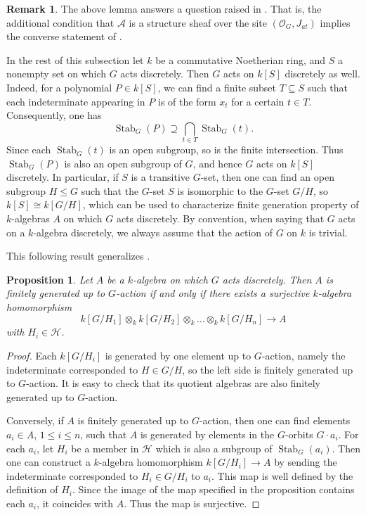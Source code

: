\documentclass[11pt, reqno]{amsart}
\theoremstyle{plain}
\newtheorem{proposition}[theorem]{Proposition}
\numberwithin{equation}{section}
\theoremstyle{definition}
\newtheorem{remark}[theorem]{Remark}
\DeclareMathOperator{\Stab}{Stab}
\begin{document}
\begin{remark}
The above lemma answers a question raised in \cite[Remark 2.16]{NR1}. That is, the additional condition that $\mathcal{A}$ is a structure sheaf over the site $(\mathcal{O}_G, J_{at})$ implies the converse statement of \cite[Proposition 2.15]{NR1}.
\end{remark}

In the rest of this subsection let $k$ be a commutative Noetherian ring, and $S$ a nonempty set on which $G$ acts discretely. Then $G$ acts on $k[S]$ discretely as well. Indeed, for a polynomial $P \in k[S]$,  we can find a finite subset $T \subseteq S$ such that each indeterminate appearing in $P$ is of the form $x_t$ for a certain $t \in T$. Consequently, one has
\[
\Stab_G(P) \supseteq \bigcap_{t \in T} \Stab_G(t).
\]
Since each $\Stab_G(t)$ is an open subgroup, so is the finite intersection. Thus $\Stab_G(P)$ is also an open subgroup of $G$, and hence $G$ acts on $k[S]$ discretely. In particular, if $S$ is a transitive $G$-set, then one can find an open subgroup $H \leqslant G$ such that the $G$-set $S$ is isomorphic to the $G$-set $G/H$, so $k[S] \cong k[G/H]$, which can be used to characterize finite generation property of $k$-algebras $A$ on which $G$ acts discretely. By convention, when saying that $G$ acts on a $k$-algebra discretely, we always assume that the action of $G$ on $k$ is trivial.

This following result generalizes \cite[Proposition 2.19]{NR1}.

\begin{proposition}
Let $A$ be a $k$-algebra on which $G$ acts discretely. Then $A$ is finitely generated up to $G$-action if and only if there exists a surjective $k$-algebra homomorphism
\[
k[G/H_1] \otimes_k k[G/H_2] \otimes_k \ldots \otimes_k k[G/H_n] \longrightarrow A
\]
with $H_i \in \mathcal{H}$.
\end{proposition}

\begin{proof}
Each $k[G/H_i]$ is generated by one element up to $G$-action, namely the indeterminate corresponded to $H \in G/H$, so the left side is finitely generated up to $G$-action. It is easy to check that its quotient algebras are also finitely generated up to $G$-action.

Conversely, if $A$ is finitely generated up to $G$-action, then one can find elements $a_i \in A$, $1 \leqslant i \leqslant n$, such that $A$ is generated by elements in the $G$-orbits $G \cdot a_i$. For each $a_i$, let $H_i$ be a member in $\mathcal{H}$ which is also a subgroup of $\Stab_G(a_i)$. Then one can construct a $k$-algebra homomorphism $k[G/H_i] \to A$ by sending the indeterminate corresponded to $H_i \in G/H_i$ to $a_i$. This map is well defined by the definition of $H_i$. Since the image of the map specified in the proposition contains each $a_i$, it coincides with $A$. Thus the map is surjective.
\end{proof}
\end{document}
